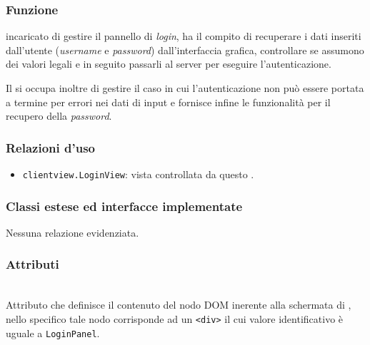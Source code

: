
\subsubsection*{Funzione}
 incaricato di gestire il pannello di \textit{login}, ha il compito di recuperare i dati inseriti dall'utente (\textit{username} e \textit{password}) dall'interfaccia grafica, controllare se assumono dei valori legali e in seguito passarli al server per eseguire l'autenticazione.

Il  si occupa inoltre di gestire il caso in cui l'autenticazione non può essere portata a termine per errori nei dati di input e fornisce infine le funzionalità per il recupero della \textit{password}.

\subsubsection*{Relazioni d'uso}
\begin{itemize}
  \item \texttt{clientview.LoginView}: vista controllata da questo .
\end{itemize}

\subsubsection*{Classi estese ed interfacce implementate}
Nessuna relazione evidenziata.

\subsubsection*{Attributi}
\begin{description}

\item{}\\
Attributo che definisce il contenuto del nodo DOM inerente alla schermata di , nello specifico tale nodo corrisponde ad un \verb+<div>+ il cui valore identificativo è uguale a \texttt{LoginPanel}.

\end{description}

